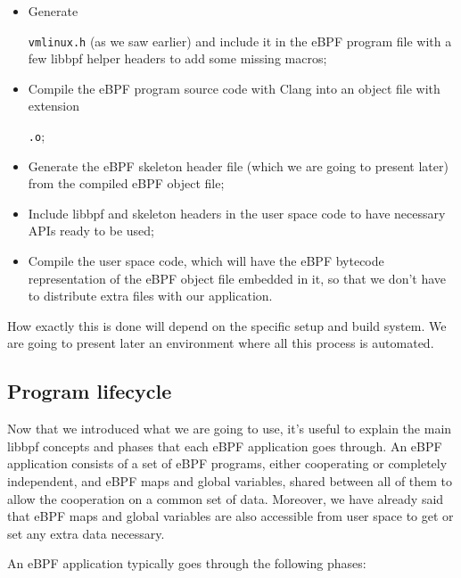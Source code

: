 \begin{itemize}
	\item 
		Generate \raggedright\colorbox{backcolour}{\lstinline[style=commandline, language=bash]|vmlinux.h|} (as we saw earlier) and include it in the eBPF program file with a few libbpf helper headers to add some missing macros; 
	\item 
		Compile the eBPF program source code with Clang into an object file with extension \raggedright\colorbox{backcolour}{\lstinline[style=commandline, language=bash]|.o|};
	\item 
		Generate the eBPF skeleton header file (which we are going to present later) from the compiled eBPF object file;
	\item 
		Include libbpf and skeleton headers in the user space code to have necessary APIs ready to be used;
	\item 
		Compile the user space code, which will have the eBPF bytecode representation of the eBPF object file embedded in it, so that we don’t have to distribute extra files with our application.
\end{itemize}

How exactly this is done will depend on the specific setup and build system.
We are going to present later an environment where all this process is automated.

\subsection{Program lifecycle}

Now that we introduced what we are going to use, it’s useful to explain the main libbpf concepts and phases that each eBPF application goes through. 
An eBPF application consists of a set of eBPF programs, either cooperating or completely independent, and eBPF maps and global variables, shared between all of them to allow the cooperation on a common set of data. 
Moreover, we have already said that eBPF maps and global variables are also accessible from user space to get or set any extra data necessary. 

An eBPF application typically goes through the following phases:

